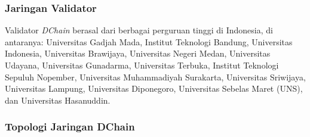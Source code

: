 \subsubsection{Jaringan Validator}

Validator \textit{DChain} berasal dari berbagai perguruan tinggi di Indonesia, di antaranya: Universitas Gadjah Mada, Institut Teknologi Bandung, Universitas Indonesia, Universitas Brawijaya, Universitas Negeri Medan, Universitas Udayana, Universitas Gunadarma, Universitas Terbuka, Institut Teknologi Sepuluh Nopember, Universitas Muhammadiyah Surakarta, Universitas Sriwijaya, Universitas Lampung, Universitas Diponegoro, Universitas Sebelas Maret (UNS), dan Universitas Hasanuddin.

\subsubsection{Topologi Jaringan DChain}

